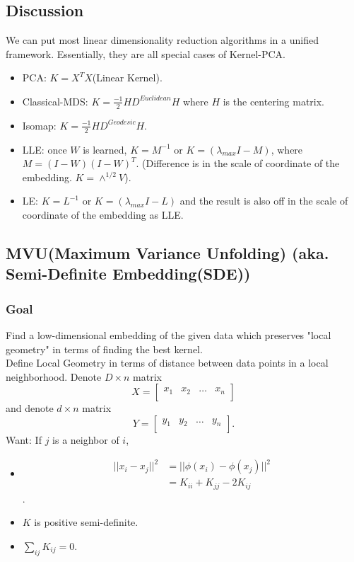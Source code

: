 \subsection*{Discussion}
We can put most linear dimensionality reduction algorithms in a
unified framework. Essentially, they are all special cases of
Kernel-PCA. 
\begin{itemize}
\item PCA: $K=X^T X$(Linear Kernel).
\item Classical-MDS: $K=\frac{-1}{2} HD^{Euclidean}H$ where $H$ is the
  centering matrix. 
\item Isomap: $K=\frac{-1}{2} HD^{Geodesic}H$.
\item LLE: once $W$ is learned, $K=M^{-1}$ or $K=(\lambda_{max} I -
  M)$, where $M=(I-W)(I-W)^T$. (Difference is in the scale of
  coordinate of the embedding. $K=\wedge^{1/2} V$). 
\item LE: $K=L^{-1}$ or $K=(\lambda_{max} I - L)$ and the result is
  also off in the scale of coordinate of the embedding as LLE. 
\end{itemize}

\subsection*{MVU(Maximum Variance Unfolding) (aka. Semi-Definite Embedding(SDE))}
\subsubsection*{Goal} Find a low-dimensional embedding of the given
data which preserves "local geometry" in terms of finding the best
kernel.\\
Define Local Geometry in terms of distance between data points in a
local neighborhood. Denote $D\times n$ matrix
\[
X=
\begin{bmatrix}
    x_1 & x_2 & \dots & x_n \\
\end{bmatrix}
\]
and denote $d\times n$ matrix
\[
Y=
\begin{bmatrix}
    y_1 & y_2 & \dots & y_n \\
\end{bmatrix}.
\]
Want: If $j$ is a neighbor of $i$,
\begin{itemize}
\item \begin{align*}
||x_i - x_j||^2
&=||\phi (x_i)-\phi (x_j)||^2\\
&=K_{ii}+K_{jj}-2K_{ij}
\end{align*}.
\item $K$ is positive semi-definite.
\item $\sum_{ij} K_{ij}=0$.
\end{itemize}


